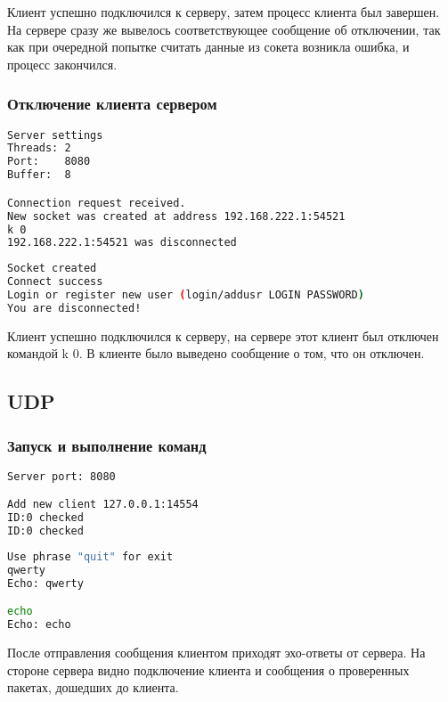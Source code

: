 Клиент успешно подключился к серверу, затем процесс клиента был завершен. На сервере сразу же вывелось соответствующее сообщение об отключении, так как при очередной попытке считать данные из сокета возникла ошибка, и процесс закончился.

\subsubsection{Отключение клиента сервером}

\begin{lstlisting}[language=bash, caption=Лог сервера]
Server settings
Threads: 2
Port:    8080
Buffer:  8

Connection request received.
New socket was created at address 192.168.222.1:54521
k 0
192.168.222.1:54521 was disconnected
\end{lstlisting}

\begin{lstlisting}[language=bash, caption=Лог клиента]
Socket created
Connect success
Login or register new user (login/addusr LOGIN PASSWORD)
You are disconnected!
\end{lstlisting}

Клиент успешно подключился к серверу, на сервере этот клиент был отключен командой k 0. В клиенте было выведено сообщение о том, что он отключен.

\subsection{UDP}

\subsubsection{Запуск и выполнение команд}

\begin{lstlisting}[language=bash, caption=Лог сервера]
Server port: 8080

Add new client 127.0.0.1:14554
ID:0 checked
ID:0 checked
\end{lstlisting}

\begin{lstlisting}[language=bash, caption=Лог клиента]
Use phrase "quit" for exit
qwerty
Echo: qwerty

echo
Echo: echo
\end{lstlisting}

После отправления сообщения клиентом приходят эхо-ответы от сервера. На стороне сервера видно подключение клиента и сообщения о проверенных пакетах, дошедших до клиента.

